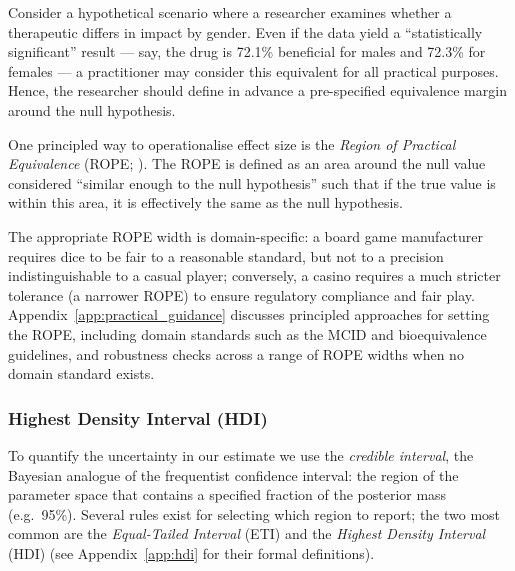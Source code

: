 Consider a hypothetical scenario where a researcher examines whether a therapeutic
differs in impact by gender.
Even if the data yield a ``statistically significant'' result --- say, the drug is
72.1\% beneficial for males and 72.3\% for females --- a practitioner may consider
this equivalent for all practical purposes.
Hence, the researcher should define in advance a pre-specified equivalence margin
around the null hypothesis.

One principled way to operationalise effect size is the
\textit{Region of Practical Equivalence} (ROPE; \citealt{kruschke2011}).
The ROPE is defined as an area around the null value considered ``similar enough to the null hypothesis''
such that if the true value is within this area, it is effectively the same as the null hypothesis.

The appropriate ROPE width is domain-specific: a board game manufacturer requires
dice to be fair to a reasonable standard, but not to a precision indistinguishable
to a casual player; conversely, a casino requires a much stricter tolerance (a narrower
ROPE) to ensure regulatory compliance and fair play.
Appendix~\ref{app:practical_guidance} discusses principled approaches for setting
the ROPE, including domain standards such as the MCID and bioequivalence guidelines,
and robustness checks across a range of ROPE widths when no domain standard exists.

\subsubsection{Highest Density Interval (HDI)}\label{sec:precision_hdi}

To quantify the uncertainty in our estimate we use the \textit{credible interval},
the Bayesian analogue of the frequentist confidence interval:
the region of the parameter space that contains a specified fraction of the posterior mass
(e.g.\ 95\%).
Several rules exist for selecting which region to report; the two most common are the
\textit{Equal-Tailed Interval} (ETI) and the \textit{Highest Density Interval} (HDI)
(see Appendix~\ref{app:hdi} for their formal definitions).


